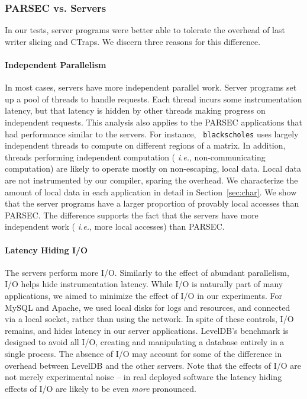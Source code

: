 \documentclass[preprint,9pt]{sigplanconf}
\newcommand{\ctraps}{CTraps\xspace}
\begin{document}
\subsubsection{PARSEC vs. Servers}
\label{sec:eval:parsecserver}
In our tests, server programs were better able to tolerate the overhead of
last writer slicing and \ctraps.   We discern three reasons for this difference.

\paragraph{Independent Parallelism}
In most cases, servers have more independent parallel work.  Server programs
set up a pool of threads to handle requests.  Each thread incurs some
instrumentation latency, but that latency is hidden by other threads making
progress on independent requests.  This analysis also applies to the PARSEC
applications that had performance similar to the servers.  For instance, {\tt
blackscholes} uses largely independent threads to compute on different regions
of a matrix.  In addition, threads performing independent computation ({\em
i.e.}, non-communicating computation) are likely to operate mostly on
non-escaping, local data.  Local data are not instrumented by our compiler,
sparing the overhead.  We characterize the amount of local data in each
application in detail in Section~\ref{sec:char}.  We show that the server
programs have a larger proportion of provably local accesses than PARSEC.  The
difference supports the fact that the servers have more independent work ({\em
i.e.}, more local accesses) than PARSEC. 



\paragraph{Latency Hiding I/O}
The servers perform more I/O.  Similarly to the effect of abundant parallelism,
I/O helps hide instrumentation latency.  While I/O is naturally part of many
applications, we aimed to minimize the effect of I/O in our experiments.  For
MySQL and Apache, we used local disks for logs and resources, and connected via
a local socket, rather than using the network.  In spite of these controls, I/O
remains, and hides latency in our server applications.  LevelDB's benchmark is
designed to avoid all I/O, creating and manipulating a database entirely in a
single process.  The absence of I/O may account for some of the difference in
overhead between LevelDB and the other servers.  Note that the effects of I/O
are not merely experimental noise -- in real deployed software the latency
hiding effects of I/O are likely to be even {\em more} pronounced.
\end{document}
